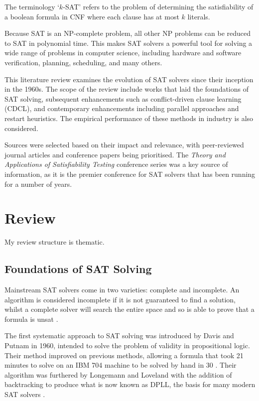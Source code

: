 \documentclass[conference]{IEEEtran}
\begin{document}
The terminology `\(k\)-SAT' refers to the problem of determining the satisfiability of a boolean formula in CNF where each clause has at most \(k\) literals.

Because SAT is an NP-complete problem, all other NP problems can be reduced to SAT in polynomial time. This makes SAT solvers a powerful tool for solving a wide range of problems in computer science, including hardware and software verification, planning, scheduling, and many others.

This literature review examines the evolution of SAT solvers since their inception in the 1960s. The scope of the review include works that laid the foundations of SAT solving, subsequent enhancements such as conflict-driven clause learning (CDCL), and contemporary enhancements including parallel approaches and restart heuristics. The empirical performance of these methods in industry is also considered.

Sources were selected based on their impact and relevance, with peer-reviewed journal articles and conference papers being prioritised. The \emph{Theory and Applications of Satisfiability Testing} conference series was a key source of information, as it is the premier conference for SAT solvers that has been running for a number of years.

\section{Review}
My review structure is thematic.

\subsection{Foundations of SAT Solving}
Mainstream SAT solvers come in two varieties: complete and incomplete. An algorithm is considered incomplete if it is not guaranteed to find a solution, whilst a complete solver will search the entire space and so is able to prove that a formula is unsat \cite{gong2017survey}.

The first systematic approach to SAT solving was introduced by Davis and Putnam in 1960, intended to solve the problem of validity in propositional logic. Their method improved on previous methods, allowing a formula that took 21 minutes to solve on an IBM 704 machine to be solved by hand in 30 \cite{martin1960computing}. Their algorithm was furthered by Longemann and Loveland with the addition of backtracking to produce what is now known as DPLL, the basis for many modern SAT solvers \cite{gong2017survey}.
\end{document}
